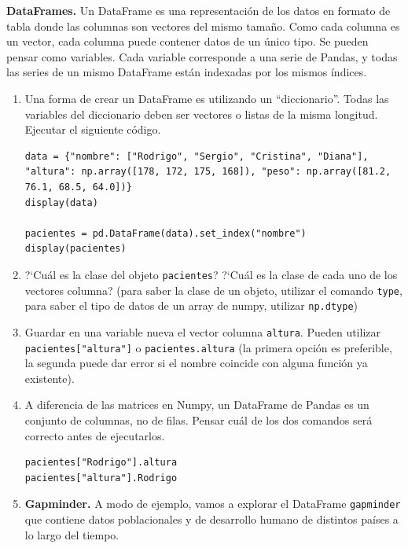 \documentclass[a4paper,11pt]{article}
\theoremstyle{definition}
\begin{document}
\textbf{DataFrames.} Un DataFrame es una representaci\'on de los datos en formato de tabla donde las columnas son vectores del mismo tama\~no. Como cada columna es un vector, cada columna puede contener datos de un \'unico tipo. Se pueden pensar como variables. Cada variable corresponde a una serie de Pandas, y todas las series de un mismo DataFrame están indexadas por los mismos índices.

\begin{enumerate}[resume]
\item Una forma de crear un DataFrame es utilizando un ``diccionario''. Todas las variables del diccionario deben ser vectores o listas de la misma longitud. Ejecutar el siguiente c\'odigo.

\begin{lstlisting}
data = {"nombre": ["Rodrigo", "Sergio", "Cristina", "Diana"], "altura": np.array([178, 172, 175, 168]), "peso": np.array([81.2, 76.1, 68.5, 64.0])}
display(data)

pacientes = pd.DataFrame(data).set_index("nombre")
display(pacientes)
\end{lstlisting}

\item ?`Cuál es la clase del objeto \lstinline{pacientes}? ?`Cuál es la clase de cada uno de los vectores columna? (para saber la clase de un objeto, utilizar el comando \lstinline{type}, para saber el tipo de datos de un array de numpy, utilizar \lstinline{np.dtype})

\item Guardar en una variable nueva el vector columna \lstinline{altura}. Pueden utilizar \lstinline{pacientes["altura"]} o \lstinline{pacientes.altura} (la primera opci\'on es preferible, la segunda puede dar error si el nombre coincide con alguna funci\'on ya existente).

\item A diferencia de las matrices en Numpy, un DataFrame de Pandas es un conjunto de columnas, no de filas. Pensar cu\'al de los dos comandos ser\'a correcto antes de ejecutarlos.
\begin{lstlisting}
pacientes["Rodrigo"].altura
pacientes["altura"].Rodrigo
\end{lstlisting}
    
    
\item \textbf{Gapminder.} A modo de ejemplo, vamos a explorar el DataFrame \lstinline{gapminder} que contiene datos poblacionales y de desarrollo humano de distintos países a lo largo del tiempo.
    

\end{enumerate}
\end{document}
